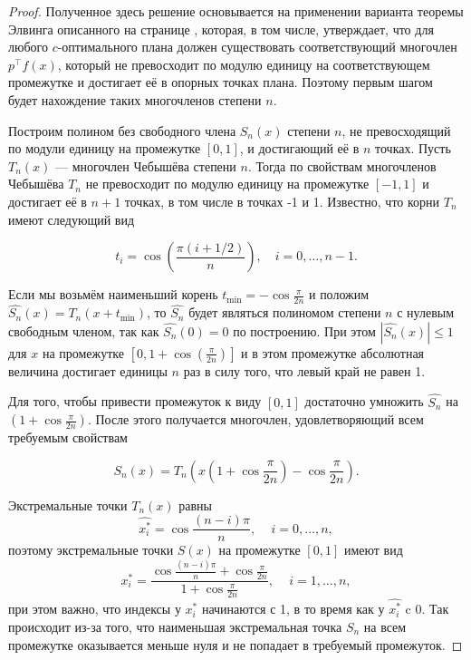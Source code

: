 \documentclass[specialist,
               substylefile = spbu.rtx,
               subf,href,colorlinks=true, 12pt]{disser}
\theoremstyle{definition}
\newcommand\abs[1]{\left\lvert#1\right\rvert}
\begin{document}
	\begin{proof}

	Полученное здесь решение основывается на применении варианта теоремы Элвинга описанного на странице \pageref{th:elfving}, которая, в том числе, утверждает, что для любого $c$-оптимального плана должен существовать соответствующий многочлен $p^\top f(x)$, который не превосходит по модулю единицу на соответствующем промежутке и достигает её в опорных точках плана. Поэтому первым шагом будет нахождение таких многочленов степени $n$.
	
	Построим полином без свободного члена $S_n(x)$ степени $n$, не превосходящий по модули единицу на промежутке $[0, 1]$, и достигающий её в $n$ точках. Пусть $T_n(x)$ --- многочлен Чебышёва степени $n$. Тогда по свойствам многочленов Чебышёва $T_n$ не превосходит по модулю единицу на промежутке $[-1, 1]$ и достигает её в $n+1$ точках, в том числе в точках -1 и 1. Известно, что корни $T_n$ имеют следующий вид
	
	\begin{equation*}
		t_{i}=\cos \left({\frac {\pi (i+1/2)}{n}}\right),\quad i=0,\ldots ,n-1.
	\end{equation*}	 
	
	Если мы возьмём наименьший корень $t_{\text{min}} = - \cos \frac{\pi}{2n}$ и положим $\widehat{S_n}(x) = T_n(x + t_{\text{min}})$, то $\widehat{S_n}$ будет являться полиномом степени $n$ с нулевым свободным членом, так как $\widehat{S_n}(0) = 0$ по построению. При этом $\abs{\widehat{S_n}(x)} \leqslant 1$ для $x$ на промежутке $[0, 1+ \cos \left(\frac{\pi}{2n}\right)]$ и в этом промежутке абсолютная величина достигает единицы $n$ раз в силу того, что левый край не равен 1.
	
	Для того, чтобы привести промежуток к виду $[0, 1]$ достаточно умножить $\widehat{S_n}$ на $\left(1 + \cos \frac{\pi}{2n} \right)$. После этого получается многочлен, удовлетворяющий всем требуемым свойствам
	
	\begin{equation*}
		S_n(x) = T_n \left(x \left(1 + \cos \frac{\pi}{2n} \right) - \cos \frac{\pi}{2n} \right).
	\end{equation*}	
	
	Экстремальные точки $T_n(x)$ равны
	\begin{equation*}
		\widehat{x_i^*} = \cos \frac{(n - i)\pi}{n}, \, \quad i = 0, \ldots, n,
	\end{equation*}
	поэтому экстремальные точки $S(x)$ на промежутке $[0, 1]$ имеют вид
	\begin{equation*}
		x_i^* = \frac{\cos \frac{(n - i) \pi}{n} + \cos \frac{\pi}{2n}}{1 + \cos \frac{\pi}{2n}} , \, \quad i = 1, \ldots, n, 
	\end{equation*}
	при этом важно, что индексы у $x_i^*$ начинаются с 1, в то время как у $\widehat{x_i^*}$ c 0. Так происходит из-за того, что наименьшая экстремальная точка $S_n$ на всем промежутке оказывается меньше нуля и не попадает в требуемый промежуток.
	

\end{proof}
\end{document}
